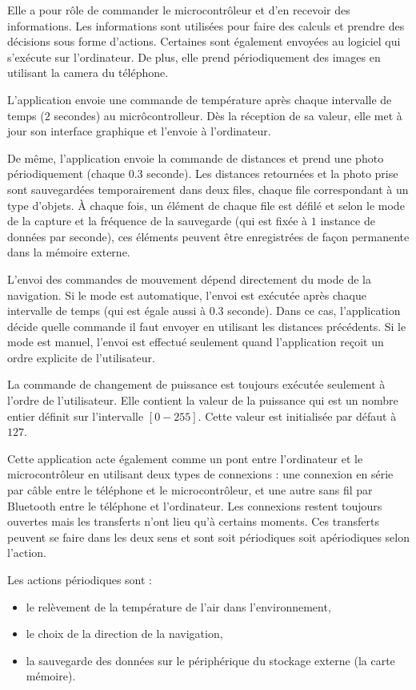 Elle a pour rôle de commander
le microcontrôleur et d'en recevoir des informations. Les informations
sont utilisées pour faire des calculs et prendre des décisions sous
forme d'actions. Certaines sont également envoyées au logiciel qui s'exécute sur
l'ordinateur. De plus, elle prend périodiquement des images en utilisant la camera
du téléphone.

L'application envoie une commande de température après chaque intervalle de temps
($2$ secondes) au micrôcontrolleur. Dès la réception de sa valeur, elle met à
jour son interface graphique et l'envoie à l'ordinateur.

De même, l'application envoie la commande de distances et prend une photo périodiquement
(chaque $0.3$ seconde). Les distances retournées et la photo prise sont sauvegardées
temporairement dans deux files, chaque file correspondant à un type d'objets.
\`A chaque fois, un élément de chaque file est défilé et selon le mode
de la capture et la fréquence de la sauvegarde (qui est fixée à $1$ instance de
données par seconde), ces éléments peuvent être enregistrées de façon permanente
dans la mémoire externe.

L'envoi des commandes de mouvement dépend directement du mode de la navigation.
Si le mode est automatique, l'envoi est exécutée après chaque intervalle de temps
(qui est égale aussi à $0.3$ seconde). Dans ce cas, l'application décide quelle
commande il faut envoyer en utilisant les distances précédents.
Si le mode est manuel, l'envoi est effectué seulement quand l'application reçoit
un ordre explicite de l'utilisateur.

La commande de changement de puissance est toujours exécutée seulement
à l'ordre de l'utilisateur. Elle contient la valeur de la puissance qui
est un nombre entier définit sur l'intervalle $[0-255]$. Cette valeur est initialisée
par défaut à $127$.

Cette application acte également comme un pont entre l'ordinateur et le microcontrôleur
en utilisant deux types de connexions : une connexion en série par câble entre
le téléphone et le microcontrôleur, et une autre sans fil par Bluetooth entre
le téléphone et l'ordinateur. Les connexions restent toujours ouvertes
mais les transferts n'ont lieu qu'à certains moments. Ces transferts peuvent
se faire dans les deux sens et sont soit périodiques soit apériodiques selon l'action.

Les actions périodiques sont :
\begin{itemize}
  \item le relèvement de la température de l'air dans l'environnement,
  \item le choix de la direction de la navigation,
  \item la sauvegarde des données sur le périphérique du stockage externe (la carte mémoire).
\end{itemize}


